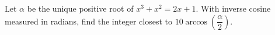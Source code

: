 Let $\alpha$ be the unique positive root of $x^3+x^2=2x+1$. With inverse cosine measured in radians, find the integer closest to $10\arccos(\dfrac{\alpha}{2})$.
